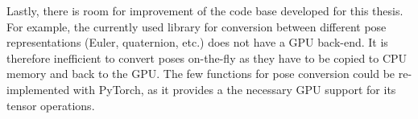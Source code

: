 Lastly, there is room for improvement of the code base developed for this thesis.
For example, the currently used library for conversion between different pose representations (Euler, quaternion, etc.) does not have a GPU back-end.
It is therefore inefficient to convert poses on-the-fly as they have to be copied to CPU memory and back to the GPU.
The few functions for pose conversion could be re-implemented with PyTorch, as it provides a the necessary GPU support for its tensor operations.

